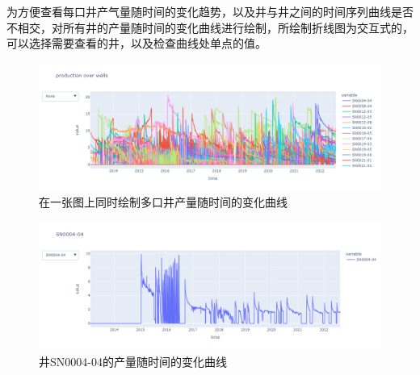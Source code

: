 为方便查看每口井产气量随时间的变化趋势，以及井与井之间的时间序列曲线是否不相交，对所有井的产量随时间的变化曲线进行绘制，所绘制折线图为交互式的，可以选择需要查看的井，以及检查曲线处单点的值。
\begin{figure}[H]
    \centering
    \includegraphics[scale=0.3,angle=0]{figure/productiongraph.png}
    \caption{在一张图上同时绘制多口井产量随时间的变化曲线}
    \label{fig:productionchange}
\end{figure}
\begin{figure}[H]
    \centering
    \includegraphics[scale=0.3,angle=0]{figure/awellgraph.png}
    \caption{井SN0004-04的产量随时间的变化曲线}
\end{figure}
